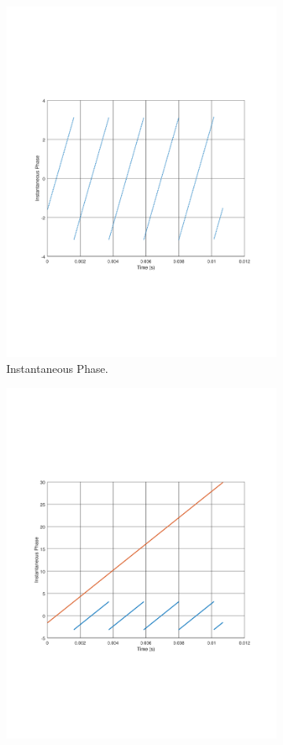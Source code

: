 \begin{figure}
	\centering
	\begin{subfigure}[t]{.5\textwidth}
		\centering
		\includegraphics[width=.9\linewidth, clip, trim={2cm 7cm 2cm 7cm}]{gfx/Modelling/IFIP.pdf}
		\caption{Instantaneous Phase.}
		\label{fig:sub1}
	\end{subfigure}%
	\begin{subfigure}[t]{.5\textwidth}
		\centering
		\includegraphics[width=.9\linewidth, clip, trim={2cm 7cm 2cm 7cm}]{gfx/Modelling/IFunwrap.pdf}

\end{subfigure}
\end{figure}
